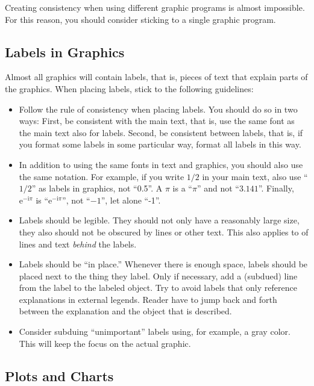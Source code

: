 Creating consistency when using different graphic programs is almost
impossible. For this reason, you should consider sticking to a single
graphic program.


\subsection{Labels in Graphics}

Almost all graphics will contain labels, that is, pieces of text that
explain parts of the graphics. When placing labels, stick to the
following guidelines:

\begin{itemize}
\item
  Follow the rule of consistency when placing labels. You should do
  so in two ways: First, be consistent with the main text, that is,
  use the same font as the main text also for labels. Second, be
  consistent between labels, that is, if you format some labels in
  some particular way, format all labels in this way.
\item
  In addition to using the same fonts in text and graphics, you should
  also use the same notation. For example, if you write $1/2$ in your
  main text, also use ``$1/2$'' as labels in graphics, not
  ``0.5''. A $\pi$ is a ``$\pi$'' and not ``$3.141$''. Finally,
  $\mathrm e^{-\mathrm i \pi}$ is ``$\mathrm e^{-\mathrm i \pi}$'',
  not ``$-1$'', let alone ``-1''. 
\item
  Labels should be legible. They should not only have a reasonably
  large size, they also should not be obscured by lines or other
  text. This also applies to of lines and text \emph{behind} the
  labels.
\item
  Labels should be ``in  place.'' Whenever there is enough space,
  labels should be placed next to the thing they label. Only if
  necessary, add a (subdued) line from the label to the labeled
  object. Try to avoid labels that only reference explanations in
  external legends. Reader have to jump back and forth between the
  explanation and the object that is described. 
\item
  Consider subduing ``unimportant'' labels using, for example, a gray
  color. This will keep the focus on the actual graphic.
\end{itemize}



\subsection{Plots and Charts}

